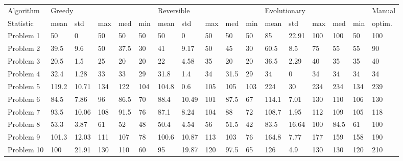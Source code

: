 \begin{tabular}{lllllllllllllllll}
\toprule
Algorithm & \multicolumn{5}{l}{Greedy} & \multicolumn{5}{l}{Reversible} & \multicolumn{5}{l}{Evolutionary} & Manual \\
Statistic &   mean &    std &  max &   med &  min &       mean &    std &  max &   med &  min &         mean &    std &  max &   med &  min & optim. \\
\midrule
Problem 1  &     50 &      0 &   50 &    50 &   50 &         50 &      0 &   50 &    50 &   50 &           85 &  22.91 &  100 &   100 &   50 &    100 \\
Problem 2  &   39.5 &    9.6 &   50 &  37.5 &   30 &         41 &   9.17 &   50 &    45 &   30 &         60.5 &    8.5 &   75 &    55 &   55 &     90 \\
Problem 3  &   20.5 &    1.5 &   25 &    20 &   20 &         22 &   4.58 &   35 &    20 &   20 &         36.5 &   2.29 &   40 &    35 &   35 &     40 \\
Problem 4  &   32.4 &   1.28 &   33 &    33 &   29 &       31.8 &    1.4 &   34 &  31.5 &   29 &           34 &      0 &   34 &    34 &   34 &     34 \\
Problem 5  &  119.2 &  10.71 &  134 &   122 &  104 &      104.8 &    0.6 &  105 &   105 &  103 &          224 &     30 &  234 &   234 &  134 &    239 \\
Problem 6  &   84.5 &   7.86 &   96 &  86.5 &   70 &       88.4 &  10.49 &  101 &  87.5 &   67 &        114.1 &   7.01 &  130 &   110 &  106 &    130 \\
Problem 7  &   93.5 &  10.06 &  108 &  91.5 &   76 &       87.1 &   8.24 &  104 &    88 &   72 &        108.7 &   1.95 &  112 &   109 &  105 &    118 \\
Problem 8  &   53.3 &   3.87 &   61 &    52 &   48 &       50.4 &   4.54 &   56 &  51.5 &   42 &         83.5 &  16.64 &  100 &  84.5 &   61 &    100 \\
Problem 9  &  101.3 &  12.03 &  111 &   107 &   78 &      100.6 &  10.87 &  113 &   103 &   76 &        164.8 &   7.77 &  177 &   159 &  158 &    190 \\
Problem 10 &    100 &  21.91 &  130 &   110 &   60 &         95 &  19.87 &  120 &  97.5 &   65 &          126 &    4.9 &  130 &   130 &  120 &    210 \\
\bottomrule
\end{tabular}
